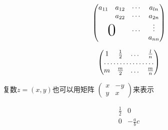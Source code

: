 \documentclass{article} %
\begin{document}
		\[
			\begin{pmatrix}%
				a_{11}&a_{12}&\cdots&a_{ln}\\
				&a_{22}&\cdots&a_{2n}\\
				&		&\dots &\vdots \\
				\multicolumn{2}{c}{\raisebox{1.3ex}[0pt]{\Huge 0}}
				&		&a_{nn}
			\end{pmatrix}
		\]


		\[
			\begin{pmatrix}%
				1&\frac 12 &\dots &\frac ln \\
				\hdotsfor{4}\\
				m&\frac m2& \dots &\frac mn
			\end{pmatrix}
		\]

		复数$z=(x,y)$也可以用矩阵
		\begin{math}
	   		\left(%
   				\begin{smallmatrix}
					x& -y\\y&x
   				\end{smallmatrix}
			\right)%
		\end{math}来表示

		\[
			\begin{array}{r|r}
				\frac 12&0\\
				\hline
				0& -\frac abc\\
			\end{array}
		\]
		
		
		
	
	
	
	
	
	
	
	
	
	
	
	
	
	
	
	
	
	
	
	
	
	
	
	
	
	
	
	
	
	
	
	
	
	
	
\end{document}
